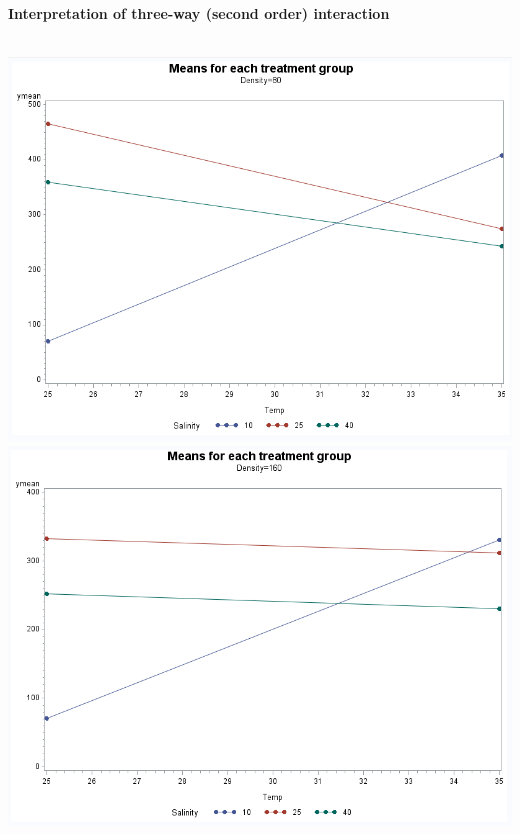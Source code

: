 \newpage
\textbf{Interpretation of three-way (second order) interaction}\\~\\
\begin{flushleft}
\includegraphics[scale=0.35]{Shrimp1}\includegraphics[scale=0.35]{Shrimp2}\\
\end{flushleft}

